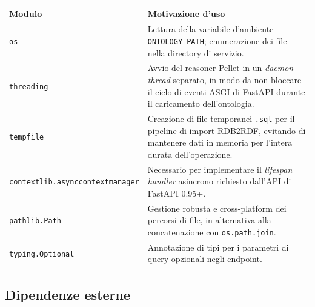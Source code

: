 \documentclass[a4paper,12pt]{article}
\begin{document}
\begin{longtable}{L{3.5cm} L{9cm}}
  \toprule
  \textbf{Modulo} & \textbf{Motivazione d'uso} \\
  \midrule
  \endhead
  \texttt{os} & Lettura della variabile d'ambiente \texttt{ONTOLOGY\_PATH};
                enumerazione dei file nella directory di servizio. \\[4pt]
  \texttt{threading} & Avvio del reasoner Pellet in un \textit{daemon thread}
                       separato, in modo da non bloccare il ciclo di eventi
                       ASGI di FastAPI durante il caricamento dell'ontologia. \\[4pt]
  \texttt{tempfile} & Creazione di file temporanei \texttt{.sql} per il
                      pipeline di import RDB2RDF, evitando di mantenere
                      dati in memoria per l'intera durata dell'operazione. \\[4pt]
  {\footnotesize\texttt{contextlib.\allowbreak{}asynccontextmanager}} & Necessario per implementare il
                      \textit{lifespan handler} asincrono richiesto dall'API
                      di FastAPI 0.95+. \\[4pt]
  \texttt{pathlib.Path} & Gestione robusta e cross-platform dei percorsi
                          di file, in alternativa alla concatenazione con
                          \texttt{os.path.join}. \\[4pt]
  \texttt{typing.Optional} & Annotazione di tipi per i parametri di query
                             opzionali negli endpoint. \\
  \bottomrule
\end{longtable}

\noindent \subsection{Dipendenze esterne}
\end{document}
